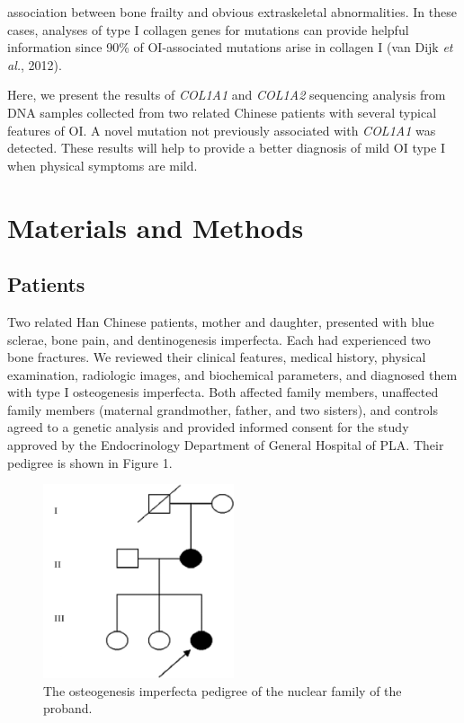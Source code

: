                 association between bone frailty and obvious extraskeletal abnormalities. In these
                cases, analyses of type I collagen genes for mutations can provide helpful
                information since 90\% of OI-associated mutations arise in collagen I (van Dijk \textit{et al.}, 2012).\par Here, we present the results of \textit{COL1A1} and \textit{COL1A2}
                sequencing analysis from DNA samples collected from two related Chinese patients
                with several typical features of OI. A novel mutation not previously associated with
                    \textit{COL1A1} was detected. These results will help to provide a
                better diagnosis of mild OI type I when physical symptoms are mild.\section*{Materials and Methods}\subsection*{Patients}\par Two related Han Chinese patients, mother and daughter, presented with blue
                    sclerae, bone pain, and dentinogenesis imperfecta. Each had experienced two bone
                    fractures. We reviewed their clinical features, medical history, physical
                    examination, radiologic images, and biochemical parameters, and diagnosed them
                    with type I osteogenesis imperfecta. Both affected family members, unaffected
                    family members (maternal grandmother, father, and two sisters), and controls
                    agreed to a genetic analysis and provided informed consent for the study
                    approved by the Endocrinology Department of General Hospital of PLA. Their
                    pedigree is shown in Figure 1.
\begin{figure}[p]
\centering
\includegraphics[width=0.5\textwidth]{1415-4757-gmb-38-1-1-gf01.png}
\caption{The osteogenesis imperfecta pedigree of the nuclear family of the
                            proband.}
\label{Figure 1}
\end{figure}

